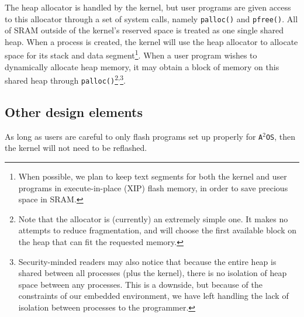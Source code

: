 \documentclass[12pt]{article}
\newcommand\fnsep{\textsuperscript{,}}
\newcommand{\osns}{\texttt{A$^2$OS}}
\begin{document}
The heap allocator is handled by the kernel, but user programs are given access
to this allocator through a set of system calls, namely \texttt{palloc()} and
\texttt{pfree()}. All of SRAM outside of the kernel's reserved space is treated
as one single shared heap. When a process is created, the kernel will use the
heap allocator to allocate space for its stack and data segment\footnote{When
possible, we plan to keep text segments for both the kernel and user programs in
execute-in-place (XIP) flash memory, in order to save precious space in SRAM.}.
When a user program wishes to dynamically allocate heap memory, it may obtain
a block of memory on this shared heap through \texttt{palloc()}\footnote{Note
that the allocator is (currently) an extremely simple one. It makes no attempts
to reduce fragmentation, and will choose the first available block on the heap
that can fit the requested memory.}\fnsep\footnote{Security-minded readers may
also notice that because the entire heap is shared between all processes (plus
the kernel), there is no isolation of heap space between any processes. This is
a downside, but because of the constraints of our embedded environment, we have
left handling the lack of isolation between processes to the programmer.}.


\subsection{Other design elements}
As long as users are careful to only flash programs set up properly for \osns,
then the kernel will not need to be reflashed.
\end{document}
